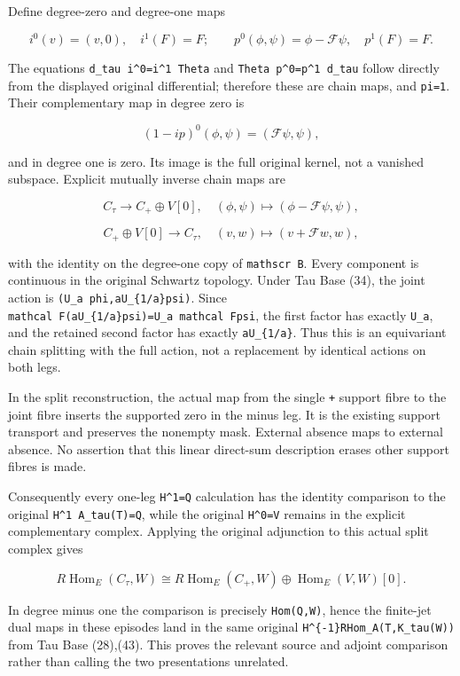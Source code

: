 Define degree-zero and degree-one maps

\[
i^0(v)=(v,0),\quad i^1(F)=F;\qquad
p^0(\phi,\psi)=\phi-\mathcal F\psi,\quad p^1(F)=F.
\]

The equations \texttt{d\_tau\ i\^{}0=i\^{}1\ Theta} and
\texttt{Theta\ p\^{}0=p\^{}1\ d\_tau} follow directly from the displayed
original differential; therefore these are chain maps, and
\texttt{pi=1}. Their complementary map in degree zero is

\[
(1-ip)^0(\phi,\psi)=(\mathcal F\psi,\psi),
\]

and in degree one is zero. Its image is the full original kernel, not a
vanished subspace. Explicit mutually inverse chain maps are

\[
C_\tau\longrightarrow C_+\oplus V[0],\quad
(\phi,\psi)\longmapsto(\phi-\mathcal F\psi,\psi),
\]

\[
C_+\oplus V[0]\longrightarrow C_\tau,\quad
(v,w)\longmapsto(v+\mathcal Fw,w),
\]

with the identity on the degree-one copy of \texttt{mathscr\ B}. Every
component is continuous in the original Schwartz topology. Under Tau
Base (34), the joint action is \texttt{(U\_a\ phi,aU\_\{1/a\}psi)}.
Since \texttt{mathcal\ F(aU\_\{1/a\}psi)=U\_a\ mathcal\ Fpsi}, the first
factor has exactly \texttt{U\_a}, and the retained second factor has
exactly \texttt{aU\_\{1/a\}}. Thus this is an equivariant chain
splitting with the full action, not a replacement by identical actions
on both legs.

In the split reconstruction, the actual map from the single \texttt{+}
support fibre to the joint fibre inserts the supported zero in the minus
leg. It is the existing support transport and preserves the nonempty
mask. External absence maps to external absence. No assertion that this
linear direct-sum description erases other support fibres is made.

Consequently every one-leg \texttt{H\^{}1=Q} calculation has the
identity comparison to the original \texttt{H\^{}1\ A\_tau(T)=Q}, while
the original \texttt{H\^{}0=V} remains in the explicit complementary
complex. Applying the original adjunction to this actual split complex
gives

\[
R\operatorname{Hom}_E(C_\tau,W)
\cong R\operatorname{Hom}_E(C_+,W)\oplus\operatorname{Hom}_E(V,W)[0].
\]

In degree minus one the comparison is precisely \texttt{Hom(Q,W)}, hence
the finite-jet dual maps in these episodes land in the same original
\texttt{H\^{}\{-1\}RHom\_A(T,K\_tau(W))} from Tau Base (28),(43). This
proves the relevant source and adjoint comparison rather than calling
the two presentations unrelated.

